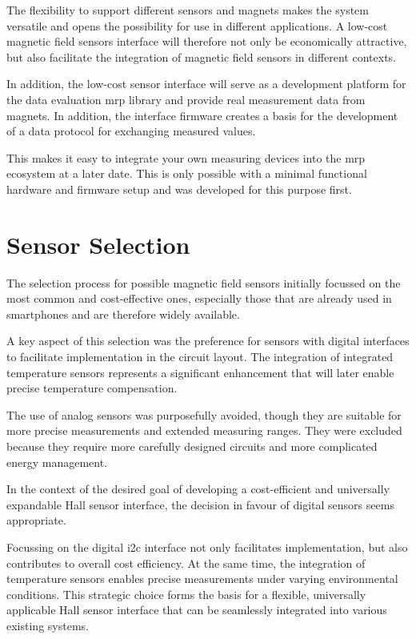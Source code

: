 The flexibility to support different sensors and magnets makes the
system versatile and opens the possibility for use in different
applications. A low-cost magnetic field sensors interface will therefore
not only be economically attractive, but also facilitate the integration
of magnetic field sensors in different contexts.

In addition, the low-cost sensor interface will serve as a development
platform for the data evaluation \gls{mrp} library and provide real
measurement data from magnets. In addition, the interface firmware
creates a basis for the development of a data protocol for exchanging
measured values.

This makes it easy to integrate your own measuring devices into the
\gls{mrp} ecosystem at a later date. This is only possible with a
minimal functional hardware and firmware setup and was developed for
this purpose first.

\hypertarget{sensor-selection}{%
\section{Sensor Selection}\label{sensor-selection}}

The selection process for possible magnetic field sensors initially
focussed on the most common and cost-effective ones, especially those
that are already used in smartphones and are therefore widely available.

A key aspect of this selection was the preference for sensors with
digital interfaces to facilitate implementation in the circuit layout.
The integration of integrated temperature sensors represents a
significant enhancement that will later enable precise temperature
compensation.

The use of analog sensors was purposefully avoided, though they are
suitable for more precise measurements and extended measuring ranges.
They were excluded because they require more carefully designed circuits
and more complicated energy management.

In the context of the desired goal of developing a cost-efficient and
universally expandable Hall sensor interface, the decision in favour of
digital sensors seems appropriate.

Focussing on the digital \gls{i2c} interface not only facilitates
implementation, but also contributes to overall cost efficiency. At the
same time, the integration of temperature sensors enables precise
measurements under varying environmental conditions. This strategic
choice forms the basis for a flexible, universally applicable Hall
sensor interface that can be seamlessly integrated into various existing
systems.

